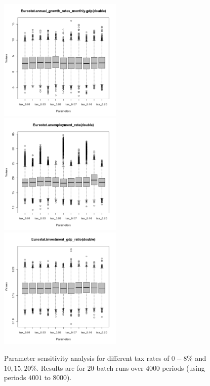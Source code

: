 \begin{figure}[ht!]
\centering\leavevmode
\begin{minipage}{7.5cm}
\centering\leavevmode
\includegraphics[width=6cm]{./batch/Eurostat-annual_growth_rates_monthly-gdp-scenarios.png}\\
\includegraphics[width=6cm]{./batch/Eurostat-unemployment_rate-scenarios.png}\\
\includegraphics[width=6cm]{./batch/Eurostat-investment_gdp_ratio-scenarios.png}
\end{minipage}
\caption{Parameter sensitivity analysis for different tax rates of $0-8\%$ and $10,15,20\%$. Results are for $20$ batch runs over $4000$ periods (using periods $4001$ to $8000$).}
\label{Figure: scenarios}
\end{figure}
